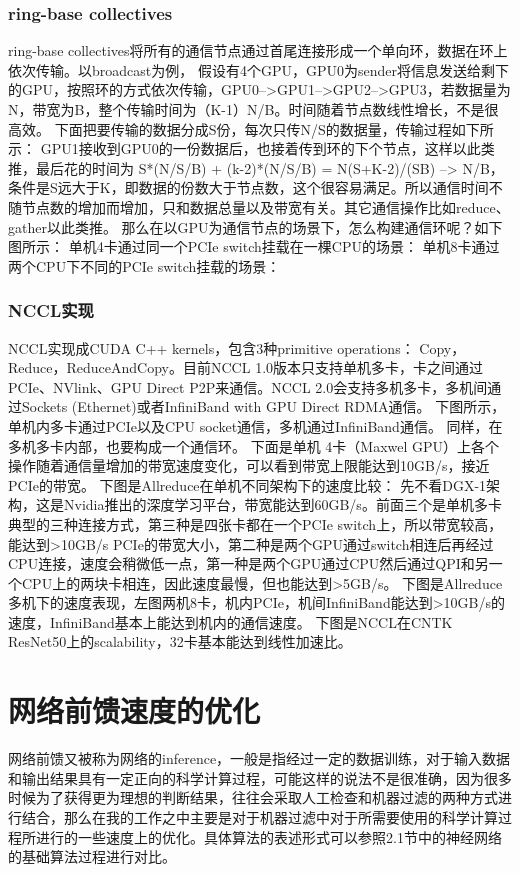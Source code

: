 \subsubsection{ring-base collectives}
ring-base collectives将所有的通信节点通过首尾连接形成一个单向环，数据在环上依次传输。以broadcast为例， 假设有4个GPU，GPU0为sender将信息发送给剩下的GPU，按照环的方式依次传输，GPU0-->GPU1-->GPU2-->GPU3，若数据量为N，带宽为B，整个传输时间为（K-1）N/B。时间随着节点数线性增长，不是很高效。
下面把要传输的数据分成S份，每次只传N/S的数据量，传输过程如下所示：
GPU1接收到GPU0的一份数据后，也接着传到环的下个节点，这样以此类推，最后花的时间为
S*(N/S/B) + (k-2)*(N/S/B) = N(S+K-2)/(SB) --> N/B，条件是S远大于K，即数据的份数大于节点数，这个很容易满足。所以通信时间不随节点数的增加而增加，只和数据总量以及带宽有关。其它通信操作比如reduce、gather以此类推。
那么在以GPU为通信节点的场景下，怎么构建通信环呢？如下图所示：
单机4卡通过同一个PCIe switch挂载在一棵CPU的场景：
单机8卡通过两个CPU下不同的PCIe switch挂载的场景：
\subsubsection{NCCL实现}
NCCL实现成CUDA C++ kernels，包含3种primitive operations： Copy，Reduce，ReduceAndCopy。目前NCCL 1.0版本只支持单机多卡，卡之间通过PCIe、NVlink、GPU Direct P2P来通信。NCCL 2.0会支持多机多卡，多机间通过Sockets (Ethernet)或者InfiniBand with GPU Direct RDMA通信。
下图所示，单机内多卡通过PCIe以及CPU socket通信，多机通过InfiniBand通信。
同样，在多机多卡内部，也要构成一个通信环。
下面是单机 4卡（Maxwel GPU）上各个操作随着通信量增加的带宽速度变化，可以看到带宽上限能达到10GB/s，接近PCIe的带宽。
下图是Allreduce在单机不同架构下的速度比较：
先不看DGX-1架构，这是Nvidia推出的深度学习平台，带宽能达到60GB/s。前面三个是单机多卡典型的三种连接方式，第三种是四张卡都在一个PCIe switch上，所以带宽较高，能达到>10GB/s PCIe的带宽大小，第二种是两个GPU通过switch相连后再经过CPU连接，速度会稍微低一点，第一种是两个GPU通过CPU然后通过QPI和另一个CPU上的两块卡相连，因此速度最慢，但也能达到>5GB/s。
下图是Allreduce多机下的速度表现，左图两机8卡，机内PCIe，机间InfiniBand能达到>10GB/s的速度，InfiniBand基本上能达到机内的通信速度。
下图是NCCL在CNTK ResNet50上的scalability，32卡基本能达到线性加速比。



\section{网络前馈速度的优化}
网络前馈又被称为网络的inference，一般是指经过一定的数据训练，对于输入数据和输出结果具有一定正向的科学计算过程，可能这样的说法不是很准确，因为很多时候为了获得更为理想的判断结果，往往会采取人工检查和机器过滤的两种方式进行结合，那么在我的工作之中主要是对于机器过滤中对于所需要使用的科学计算过程所进行的一些速度上的优化。具体算法的表述形式可以参照2.1节中的神经网络的基础算法过程进行对比。
